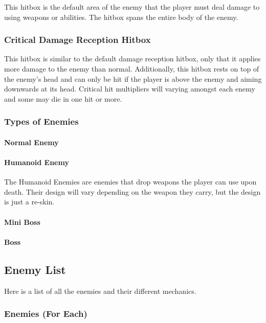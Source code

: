 \documentclass[12pt]{article}
\begin{document}
This hitbox is the default area of the enemy that the player must deal damage to using weapons or abilities. The hitbox spans the entire body of the enemy.

\subsubsection{Critical Damage Reception Hitbox}

This hitbox is similar to the default damage reception hitbox, only that it applies more damage to the enemy than normal. Additionally, this hitbox rests on top of the enemy's head and can only be hit if the player is above the enemy and aiming downwards at its head. Critical hit multipliers will varying amongst each enemy and some may die in one hit or more. 

\subsubsection{Types of Enemies}

\paragraph{Normal Enemy}

\paragraph{Humanoid Enemy}

The Humanoid Enemies are enemies that drop weapons the player can use upon death. Their design will vary depending on the weapon they carry, but the design is just a re-skin. 

\paragraph{Mini Boss}

\paragraph{Boss}

\subsection{Enemy List}

Here is a list of all the enemies and their different mechanics. 

\subsubsection{Enemies (For Each)}
\end{document}
